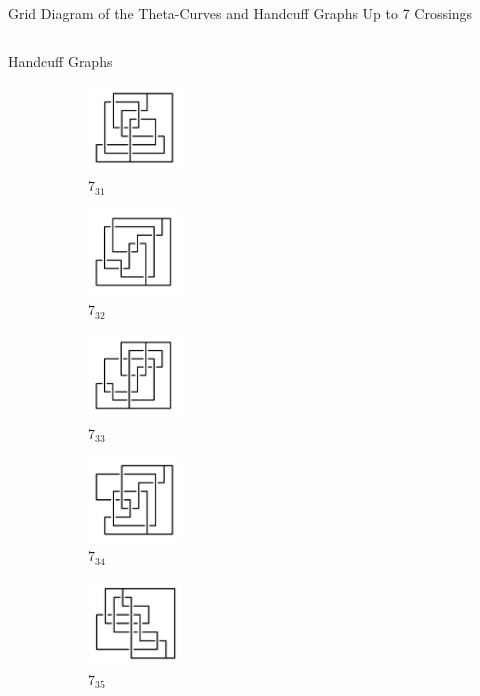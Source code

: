 \documentclass[final]{beamer}
\begin{document}
\begin{frame}[t]
\begin{alertblock}{Grid Diagram of the Theta-Curves and Handcuff Graphs Up to 7 Crossings}
\begin{columns}[t]
\begin{column}{0.3\textwidth}
\begin{alertblock}{Handcuff Graphs}
\begin{figure}
    \begin{subfigure}{0.15\textwidth}
    \includegraphics[width=2.5cm]{../Midterm_Poster/grid_diagram/handcuff_7_31.png}
    \caption{$7_{31}$} 
    \end{subfigure}
    \begin{subfigure}{0.15\textwidth}
    \includegraphics[width=2.5cm]{../Midterm_Poster/grid_diagram/handcuff_7_32.png}
    \caption{$7_{32}$} 
    \end{subfigure}
    \begin{subfigure}{0.15\textwidth}
    \includegraphics[width=2.5cm]{../Midterm_Poster/grid_diagram/handcuff_7_33.png}
    \caption{$7_{33}$} 
    \end{subfigure}
    \begin{subfigure}{0.15\textwidth}
    \includegraphics[width=2.5cm]{../Midterm_Poster/grid_diagram/handcuff_7_34.png}
    \caption{$7_{34}$} 
    \end{subfigure}
    \begin{subfigure}{0.15\textwidth}
    \includegraphics[width=2.5cm]{../Midterm_Poster/grid_diagram/handcuff_7_35.png}
    \caption{$7_{35}$} 
    \end{subfigure}
    \begin{subfigure}{0.15\textwidth}

\end{subfigure}
\end{figure}
\end{alertblock}
\end{column}
\end{columns}
\end{alertblock}
\end{frame}
\end{document}

